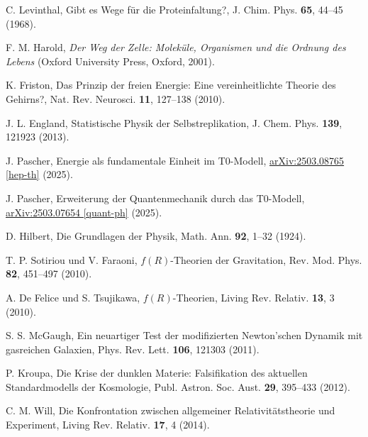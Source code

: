 \documentclass[twocolumn,aps,prl]{revtex4-2}
\begin{document}
{{{{{{{{{{{{{{{{\begin{thebibliography}{99}
																				 C. Levinthal, Gibt es Wege für die Proteinfaltung?, J. Chim. Phys. \textbf{65}, 44--45 (1968).
																				
																				 F. M. Harold, \textit{Der Weg der Zelle: Moleküle, Organismen und die Ordnung des Lebens} (Oxford University Press, Oxford, 2001).
																				
																				 K. Friston, Das Prinzip der freien Energie: Eine vereinheitlichte Theorie des Gehirns?, Nat. Rev. Neurosci. \textbf{11}, 127--138 (2010).
																				
																				 J. L. England, Statistische Physik der Selbstreplikation, J. Chem. Phys. \textbf{139}, 121923 (2013).
																				
																				 J. Pascher, Energie als fundamentale Einheit im T0-Modell, \href{https://github.com/jpascher/T0-Time-Mass-Duality/tree/main/2/pdf/Deutsch/EnergieEinheitT0.pdf}{arXiv:2503.08765 [hep-th]} (2025).
																				
																				 J. Pascher, Erweiterung der Quantenmechanik durch das T0-Modell, \href{https://github.com/jpascher/T0-Time-Mass-Duality/tree/main/2/pdf/Deutsch/QuantenT0.pdf}{arXiv:2503.07654 [quant-ph]} (2025).
																				
																				 D. Hilbert, Die Grundlagen der Physik, Math. Ann. \textbf{92}, 1--32 (1924).
																				
																				 T. P. Sotiriou und V. Faraoni, \(f(R)\)-Theorien der Gravitation, Rev. Mod. Phys. \textbf{82}, 451--497 (2010).
																				
																				 A. De Felice und S. Tsujikawa, \(f(R)\)-Theorien, Living Rev. Relativ. \textbf{13}, 3 (2010).
																				
																				 S. S. McGaugh, Ein neuartiger Test der modifizierten Newton’schen Dynamik mit gasreichen Galaxien, Phys. Rev. Lett. \textbf{106}, 121303 (2011).
																				
																				 P. Kroupa, Die Krise der dunklen Materie: Falsifikation des aktuellen Standardmodells der Kosmologie, Publ. Astron. Soc. Aust. \textbf{29}, 395--433 (2012).
																				
																				 C. M. Will, Die Konfrontation zwischen allgemeiner Relativitätstheorie und Experiment, Living Rev. Relativ. \textbf{17}, 4 (2014).
																				

\end{thebibliography}}}}}}}}}}}}}}}}}
\end{document}
